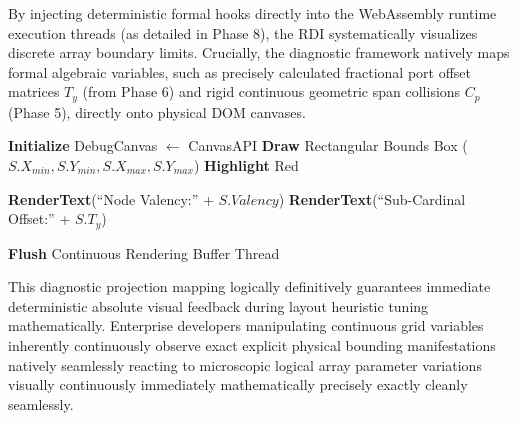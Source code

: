 \documentclass[fleqn,10pt]{wlscirep}
\begin{document}
By injecting deterministic formal hooks directly into the WebAssembly runtime execution threads (as detailed in Phase 8), the RDI systematically visualizes discrete array boundary limits. Crucially, the diagnostic framework natively maps formal algebraic variables, such as precisely calculated fractional port offset matrices $T_y$ (from Phase 6) and rigid continuous geometric span collisions $C_p$ (Phase 5), directly onto physical DOM canvases.

\begin{algorithm*}
\caption{Diagnostic execution overlay projection tracking}\label{alg:rdi_hooks}
\begin{algorithmic}[1]
    \State \textbf{Initialize} DebugCanvas $\gets$ CanvasAPI
        \State \textbf{Draw} Rectangular Bounds Box ($S.X_{min}, S.Y_{min}, S.X_{max}, S.Y_{max}$)
            \State \textbf{Highlight} Red 
        \EndIf
        
        \State \textbf{RenderText}(``Node Valency:'' + $S.Valency$) 
        \State \textbf{RenderText}(``Sub-Cardinal Offset:'' + $S.T_y$)
    \EndFor
    
    \State \textbf{Flush} Continuous Rendering Buffer Thread 
\EndProcedure
\end{algorithmic}
\end{algorithm*}

This diagnostic projection mapping logically definitively guarantees immediate deterministic absolute visual feedback during layout heuristic tuning mathematically. Enterprise developers manipulating continuous grid variables inherently continuously observe exact explicit physical bounding manifestations natively seamlessly reacting to microscopic logical array parameter variations visually continuously immediately mathematically precisely exactly cleanly seamlessly.
\end{document}
